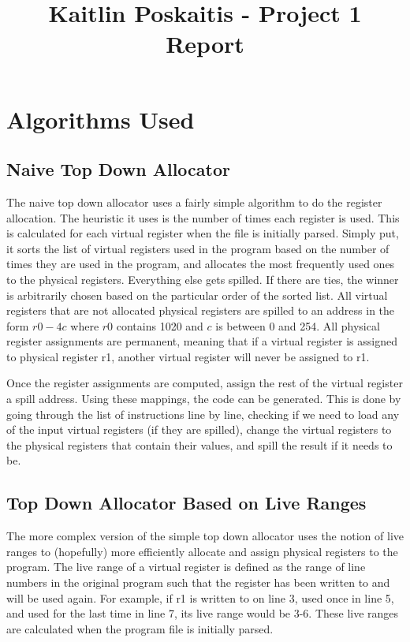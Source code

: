 \documentclass[12pt]{article}
\title{\bf Kaitlin Poskaitis - Project 1 Report}
\author{}
\date{}
\begin{document}
\maketitle

\section{Algorithms Used}

    \subsection{Naive Top Down Allocator}
    The naive top down allocator uses a fairly simple algorithm to do the
    register allocation. The heuristic it uses is the number of times each
    register is used. This is calculated for each virtual register when the file
    is initially parsed. Simply put, it sorts the list of virtual registers used
    in the program based on the number of times they are used in the program,
    and allocates the most frequently used ones to the physical registers.
    Everything else gets spilled. If there are ties, the winner is arbitrarily
    chosen based on the particular order of the sorted list. All virtual
    registers that are not allocated physical registers are spilled to an
    address in the form $r0 - 4c$ where $r0$ contains 1020 and $c$ is between 0
    and 254. All physical register assignments are permanent, meaning that
    if a virtual register is assigned to physical register r1, another virtual
    register will never be assigned to r1.

    Once the register assignments are computed, assign the rest of the virtual
    register a spill address. Using these mappings, the code can be generated.
    This is done by going through the list of instructions line by line,
    checking if we need to load any of the input virtual registers (if they are
    spilled), change the virtual registers to the physical registers that
    contain their values, and spill the result if it needs to be.

    \subsection{Top Down Allocator Based on Live Ranges}
    The more complex version of the simple top down allocator uses the notion of
    live ranges to (hopefully) more efficiently allocate and assign physical
    registers to the program. The live range of a virtual register is defined as
    the range of line numbers in the original program such that the register has
    been written to and will be used again. For example, if r1 is written to on
    line 3, used once in line 5, and used for the last time in line 7, its live
    range would be 3-6. These live ranges are calculated when the program file
    is initially parsed.
\end{document}

